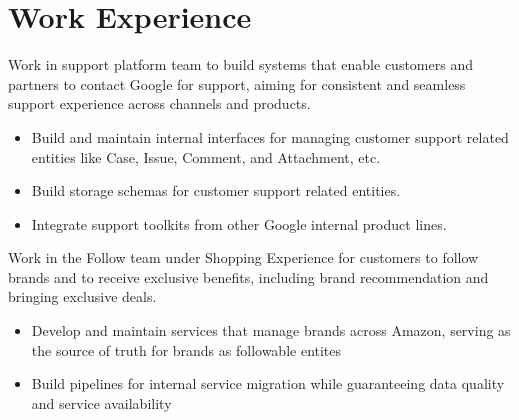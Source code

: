 \documentclass{resume}
\begin{document}
\section{Work Experience}
\begin{flushleft}
Work in support platform team to build systems that enable customers and partners to contact Google for support, aiming for consistent and seamless support experience across channels and products.
\begin{itemize}
  \item Build and maintain internal interfaces for managing customer support related entities like Case, Issue, Comment, and Attachment, etc.
  \item Build storage schemas for customer support related entities.
  \item Integrate support toolkits from other Google internal product lines.
\end{itemize}
\end{flushleft}
\begin{flushleft}
Work in the Follow team under Shopping Experience for customers to follow brands and to receive exclusive benefits, including brand recommendation and bringing exclusive deals.
\begin{itemize}
  \item Develop and maintain services that manage brands across Amazon, serving as the source of truth for brands as followable entites
  \item Build pipelines for internal service migration while guaranteeing data quality and service availability
\end{itemize}
\end{flushleft}
\end{document}
